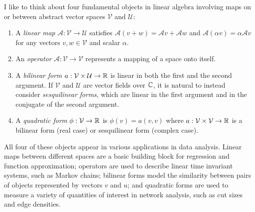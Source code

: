 \documentclass[12pt, leqno]{article} %
\begin{document}
I like to think about four fundamental objects in linear algebra
involving maps on or between abstract vector spaces $\mathcal{V}$
and $\mathcal{U}$:
\begin{enumerate}
\item A {\em linear map} $\mathcal{A} : \mathcal{V} \rightarrow \mathcal{U}$
  satisfies $\mathcal{A}(v+w) = \mathcal{A}v + \mathcal{A}w$ and
  $\mathcal{A} (\alpha v) = \alpha \mathcal{A} v$ for any vectors $v,
  w \in \mathcal{V}$ and scalar $\alpha$.
\item An {\em operator} $\mathcal{A} : \mathcal{V} \rightarrow
  \mathcal{V}$ represents a mapping of a space onto itself.
\item A {\em bilinear form}
  $a : \mathcal{V} \times \mathcal{U} \rightarrow \mathbb{R}$
  is linear in both the first and the second argument.
  If $\mathcal{V}$ and $\mathcal{U}$ are vector fields over $\mathbb{C}$,
  it is natural to instead consider {\em sesquilinear forms},
  which are linear in the first argument and in the conjugate of the
  second argument.
\item A {\em quadratic form} $\phi : \mathcal{V} \rightarrow \mathbb{R}$ is
  $\phi(v) = a(v,v)$ where $a : \mathcal{V} \times \mathcal{V}
  \rightarrow \mathbb{R}$ is a
  bilinear form (real case) or sesquilinear form (complex case).  
\end{enumerate}

All four of these objects appear in various applications in
data analysis.  Linear maps between different spaces are
a basic building block for regression and function approximation;
operators are used to describe linear time invariant systems, such as
Markov chains; bilinear forms model the similarity between pairs of objects
represented by vectors $v$ and $u$; and quadratic forms are used to
measure a variety of quantities of interest in network analysis, such
as cut sizes and edge densities.
\end{document}

